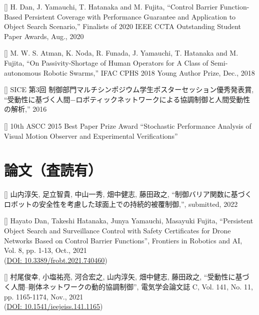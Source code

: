 \documentclass[letterpaper]{article}
\newcounter{award}
\newcounter{trans}
\begin{document}
[] 
  H. Dan, J. Yamauchi, T. Hatanaka and M. Fujita, 
  ``Control Barrier Function-Based Persistent Coverage with Performance Guarantee and Application to Object Search Scenario,'' 
  Finalists of 2020 IEEE CCTA Outstanding Student Paper Awards, Aug., 2020 \\
\addtocounter{award}{-1}

[] 
  M. W. S. Atman, K. Noda, R. Funada, J. Yamauchi, T. Hatanaka and M. Fujita, 
  ``On Passivity-Shortage of Human Operators for A Class of Semi-autonomous Robotic Swarms,'' 
  IFAC CPHS 2018 Young Author Prize, Dec., 2018 \\
\addtocounter{award}{-1}

[] 
  SICE 第3回 制御部門マルチシンポジウム学生ポスターセッション優秀発表賞,
  ``受動性に基づく人間−ロボティックネットワークによる協調制御と人間受動性の解析,'' 2016 \\
\addtocounter{award}{-1}

[]  
  10th ASCC 2015 Best Paper Prize Award
  ``Stochastic Performance Analysis of Visual Motion Observer and Experimental Verifications'' \\
\addtocounter{award}{-1}




\section*{論文（査読有）}

[]  
  山内淳矢, 足立智貴, 中山一秀, 畑中健志, 藤田政之, 
  ``制御バリア関数に基づくロボットの安全性を考慮した球面上での持続的被覆制御,'', 
  submitted, 2022 \\
\addtocounter{trans}{-1}

[]  
  Hayato Dan, Takeshi Hatanaka, Junya Yamauchi, Masayuki Fujita, 
  ``Persistent Object Search and Surveillance Control with Safety Certificates for Drone Networks Based on Control Barrier Functions'', 
  Frontiers in Robotics and AI, Vol. 8, pp. 1-13, Oct., 2021 \\
  (\href{https://www.frontiersin.org/articles/10.3389/frobt.2021.740460/full}{DOI: 10.3389/frobt.2021.740460}) \\
\addtocounter{trans}{-1}

[]  
  村尾俊幸, 小塩祐亮, 河合宏之, 山内淳矢, 畑中健志, 藤田政之, 
  ``受動性に基づく人間–剛体ネットワークの動的協調制御'', 
  電気学会論文誌 C, Vol. 141, No. 11, pp. 1165-1174, Nov., 2021 \\
  (\href{https://www.jstage.jst.go.jp/article/ieejeiss/141/11/141_1165/_article/-char/ja/}{DOI: 10.1541/ieejeiss.141.1165}) \\
\addtocounter{trans}{-1}
\end{document}
